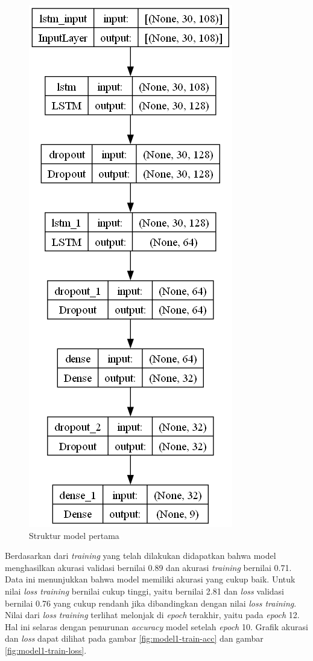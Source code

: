 \begin{figure}[H]
  \centering

  \includegraphics[scale=0.5]{gambar/bab4-uji-model-worst-model.png}

  \caption{Struktur model pertama}
  \label{fig:model1-struktur}
\end{figure}

Berdasarkan dari \emph{training} yang telah dilakukan didapatkan bahwa model menghasilkan akurasi validasi bernilai 0.89 dan akurasi \emph{training} bernilai 0.71. Data ini menunjukkan bahwa model memiliki akurasi yang cukup baik. Untuk nilai \emph{loss training} bernilai cukup tinggi, yaitu bernilai 2.81 dan \emph{loss} validasi bernilai 0.76 yang cukup rendanh jika dibandingkan dengan nilai \emph{loss training}. Nilai dari \emph{loss training} terlihat melonjak di \emph{epoch} terakhir, yaitu pada \emph{epoch} 12. Hal ini selaras dengan penurunan \emph{accuracy} model setelah \emph{epoch} 10. Grafik akurasi dan \emph{loss} dapat dilihat pada gambar \ref{fig:model1-train-acc} dan gambar \ref{fig:model1-train-loss}.

